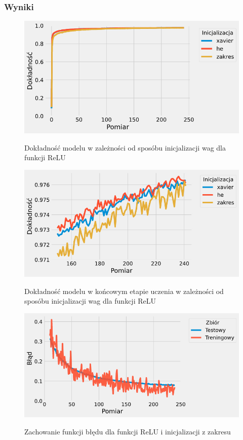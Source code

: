 \documentclass{article}
\begin{document}
\subsubsection*{Wyniki}
\begin{figure}[H]
	\centering
	\caption{Dokładność modelu w zależności od sposóbu inicjalizacji wag dla funkcji ReLU}
	\includegraphics[width=\textwidth]{relu_init_acc.png}
	\label{fig:res201}
\end{figure}
\begin{figure}[H]
	\centering
	\caption{Dokładność modelu w końcowym etapie uczenia w zależności od sposóbu inicjalizacji wag dla funkcji ReLU}
	\includegraphics[width=\textwidth]{relu_init_acc_zoom.png}
	\label{fig:res202}
\end{figure}
\begin{figure}[H]
	\centering
	\caption{Zachowanie funkcji błędu dla funkcji ReLU i inicjalizacji z zakresu}
	\includegraphics[width=\textwidth]{relu_init_zak.png}
	\label{fig:res203}
\end{figure}
\end{document}
